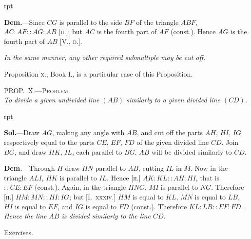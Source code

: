 \documentclass[oneside]{book}
\newcounter{wrapwidth}
\newcommand\myprop[2]{
\bigskip\Needspace*{4\baselineskip}\begin{center}\textsc{#1}\\\medskip\emph{#2}\par\end{center}
}
\newcommand\exhead[1]{
\Needspace*{5\baselineskip}\begin{center}
\textsf{#1}
\end{center}
}
\newcommand\imgflow[3]{
\setcounter{wrapwidth}{#1}

\begin{wrapfigure}[#2]{r}{\value{wrapwidth}pt}
\begin{center}
\vspace{-0.3in}

\end{center}
\end{wrapfigure}
}
\begin{document}
\imgflow{115}{6}{f177}

\textbf{Dem.}---Since $CG$ is parallel to the side $BF$ of the
triangle $ABF$, $AC : AF :: AG
: AB$ [\textsc{ii.}]; but $AC$ is the fourth
part of $AF$ (const.). Hence $AG$
is the fourth part of $AB$ [V., \textsc{d.}].

\textit{In the same manner, any other required
submultiple may be cut off.}

Proposition \textsc{x.}, Book I., is a particular case of this
Proposition.

\myprop{PROP\@.~X.---Problem.}{To divide a given undivided line $(AB)$ similarly to a given
divided line $(CD)$.}


\imgflow{140}{8}{f178}

\textbf{Sol.}---Draw $AG$, making any angle with $AB$, and
cut off the parts $AH$, $HI$, $IG$
respectively equal to the
parts $CE$, $EF$, $FD$ of the
given divided line $CD$. Join
$BG$, and draw $HK$, $IL$, each
parallel to $BG$. $AB$ will be
divided similarly to $CD$.

\textbf{Dem.}---Through $H$ draw
$HN$ parallel to $AB$, cutting $IL$ in $M$. Now in the
triangle $ALI$, $HK$ is parallel to $IL$. Hence [\textsc{ii.}]
$AK : KL :: AH : HI$, that is $:: CE : EF$ (const.).
Again, in the triangle $HNG$, $MI$ is parallel to $NG$.
Therefore [\textsc{ii.}] $HM : MN :: HI : IG$; but [I.~\textsc{xxxiv.}]
$HM$ is equal to $KL$, $MN$ is equal to $LB$, $HI$ is equal
to $EF$, and $IG$ is equal to $FD$ (const.). Therefore
$KL : LB :: EF : FD$. \textit{Hence the line $AB$ is divided
similarly to the line $CD$.}

\exhead{Exercises.}
\end{document}
